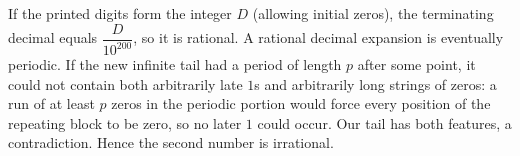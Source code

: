 If the printed digits form the integer $D$ (allowing initial zeros), the terminating decimal equals $\dfrac{D}{10^{200}}$, so it is rational.
A rational decimal expansion is eventually periodic. If the new infinite tail had a period of length $p$ after some point, it could not contain both arbitrarily late $1$s and arbitrarily long strings of zeros: a run of at least $p$ zeros in the periodic portion would force every position of the repeating block to be zero, so no later $1$ could occur. Our tail has both features, a contradiction. Hence the second number is irrational.
